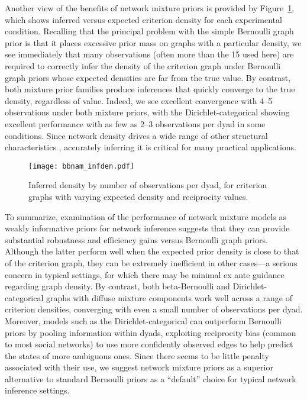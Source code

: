 \documentclass[11pt]{article}
\begin{document}
Another view of the benefits of network mixture priors is provided by Figure~\ref{f_infden}, which shows inferred versus expected criterion density for each experimental condition.  Recalling that the principal problem with the simple Bernoulli graph prior is that it places excessive prior mass on graphs with a particular density, we see immediately that many observations (often more than the 15 used here) are required to correctly infer the density of the criterion graph under Bernoulli graph priors whose expected densities are far from the true value.  By contrast, both mixture prior families produce inferences that quickly converge to the true density, regardless of value.  Indeed, we see excellent convergence with 4--5 observations under both mixture priors, with the Dirichlet-categorical showing excellent performance with as few as 2--3 observations per dyad in some conditions.  Since network density drives a wide range of other structural characteristics \citep[see, e.g.][]{anderson.et.al:sn:1999,butts:sn:2006,faust:sm:2007}, accurately inferring it is critical for many practical applications.

\begin{figure}
\begin{center}
\texttt{[image: bbnam\_infden.pdf]}
\caption{\label{f_infden} Inferred density by number of observations per dyad, for criterion graphs with varying expected density and reciprocity values.}
\end{center}
\end{figure}

To summarize, examination of the performance of network mixture models as weakly informative priors for network inference suggests that they can provide substantial robustness and efficiency gains versus Bernoulli graph priors.  Although the latter perform well when the expected prior density is close to that of the criterion graph, they can be extremely inefficient in other cases---a serious concern in typical settings, for which there may be minimal ex ante guidance regarding graph density.  By contrast, both beta-Bernoulli and Dirichlet-categorical graphs with diffuse mixture components work well across a range of criterion densities, converging with even a small number of observations per dyad.  Moreover, models such as the Dirichlet-categorical can outperform Bernoulli priors by pooling information within dyads, exploiting reciprocity bias (common to most social networks) to use more confidently observed edges to help predict the states of more ambiguous ones.  Since there seems to be little penalty associated with their use, we suggest network mixture priors as a superior alternative to standard Bernoulli priors as a ``default'' choice for typical network inference settings.
\end{document}
